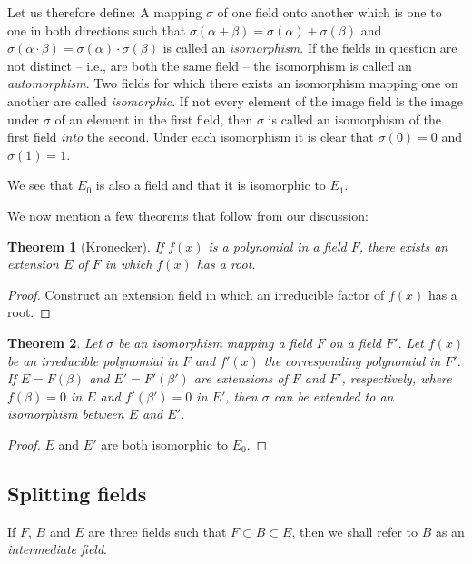 \documentclass[10pt,leqno]{article}
\newtheorem{theo}{Theorem}
\theoremstyle{definition}
\begin{document}
Let us therefore define:
A mapping $\sigma$ of one field onto another which is one to one in both directions such that $\sigma(\alpha + \beta) = \sigma(\alpha) + \sigma(\beta)$ and $\sigma(\alpha \cdot \beta) = \sigma(\alpha) \cdot \sigma(\beta)$ is called an \emph{isomorphism}.
If the fields in question are not distinct -- i.e., are both the same field -- the isomorphism is called an \emph{automorphism}.
Two fields for which there exists an isomorphism mapping one on another are called \emph{isomorphic}.
If not every element of the image field is the image under $\sigma$ of an element in the first field, then $\sigma$ is called an isomorphism of the first field \emph{into} the second.
Under each isomorphism it is clear that $\sigma(0) = 0$ and $\sigma(1) = 1$.

We see that $E_0$ is also a field and that it is isomorphic to $E_1$.

We now mention a few theorems that follow from our discussion:

\begin{theo}[Kronecker]
\label{theo:se}
If $f(x)$ is a polynomial in a field $F$, there exists an extension $E$ of $F$ in which $f(x)$ has a root.
\end{theo}

\begin{proof}
Construct an extension field in which an irreducible factor of $f(x)$ has a root.
\end{proof}

\begin{theo}
\label{theo:ei}
Let $\sigma$ be an isomorphism mapping a field $F$ on a field $F'$.
Let $f(x)$ be an irreducible polynomial in $F$ and $f'(x)$ the corresponding polynomial in $F'$.
If $E = F(\beta)$ and $E' = F'(\beta')$ are extensions of $F$ and $F'$, respectively, where $f(\beta) = 0$ in $E$ and $f'(\beta') = 0$ in $E'$, then $\sigma$ can be extended to an isomorphism between $E$ and $E'$.
\end{theo}

\begin{proof}
$E$ and $E'$ are both isomorphic to $E_0$.
\end{proof}


\subsection{Splitting fields}

If $F$, $B$ and $E$ are three fields such that $F \subset B \subset E$, then we shall refer to $B$ as an \emph{intermediate field}.
\end{document}
